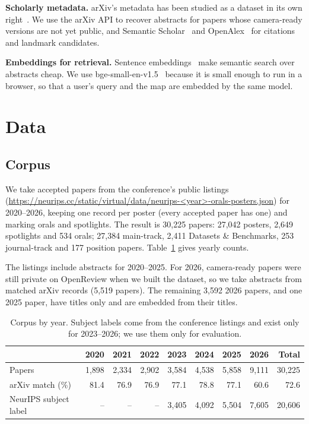 \documentclass{article}
\begin{document}
\textbf{Scholarly metadata.} arXiv's metadata has been studied as a dataset in its own right~\cite{clement2019arxiv}. We use the arXiv API to recover abstracts for papers whose camera-ready versions are not yet public, and Semantic Scholar~\cite{kinney2023s2} and OpenAlex~\cite{priem2022openalex} for citations and landmark candidates.

\textbf{Embeddings for retrieval.} Sentence embeddings~\cite{reimers2019sbert} make semantic search over abstracts cheap. We use bge-small-en-v1.5~\cite{xiao2023cpack} because it is small enough to run in a browser, so that a user's query and the map are embedded by the same model.

\section{Data}
\subsection{Corpus}
We take accepted papers from the conference's public listings (\url{https://neurips.cc/static/virtual/data/neurips-<year>-orals-posters.json}) for 2020--2026, keeping one record per poster (every accepted paper has one) and marking orals and spotlights. The result is 30{,}225 papers: 27{,}042 posters, 2{,}649 spotlights and 534 orals; 27{,}384 main-track, 2{,}411 Datasets \& Benchmarks, 253 journal-track and 177 position papers. Table~\ref{tab:corpus} gives yearly counts.

The listings include abstracts for 2020--2025. For 2026, camera-ready papers were still private on OpenReview when we built the dataset, so we take abstracts from matched arXiv records (5{,}519 papers). The remaining 3{,}592 2026 papers, and one 2025 paper, have titles only and are embedded from their titles.

\begin{table}[t]
\centering\small
\caption{Corpus by year. Subject labels come from the conference listings and exist only for 2023--2026; we use them only for evaluation.}
\label{tab:corpus}
\begin{tabular}{lrrrrrrrr}
\toprule
 & 2020 & 2021 & 2022 & 2023 & 2024 & 2025 & 2026 & Total \\
\midrule
Papers & 1{,}898 & 2{,}334 & 2{,}902 & 3{,}584 & 4{,}538 & 5{,}858 & 9{,}111 & 30{,}225 \\
arXiv match (\%) & 81.4 & 76.9 & 76.9 & 77.1 & 78.8 & 77.1 & 60.6 & 72.6 \\
NeurIPS subject label & -- & -- & -- & 3{,}405 & 4{,}092 & 5{,}504 & 7{,}605 & 20{,}606 \\
\bottomrule
\end{tabular}
\end{table}
\end{document}
